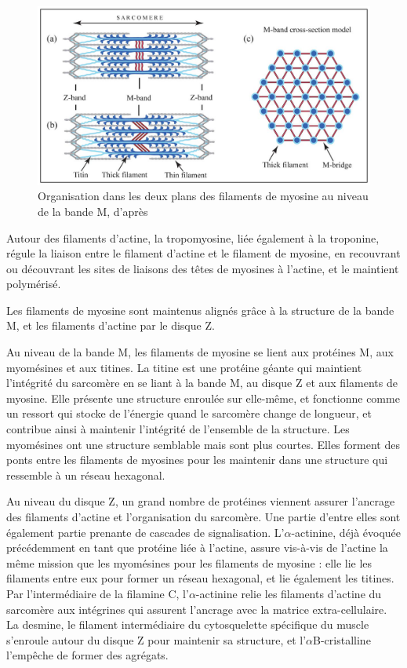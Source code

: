 \begin{figure}
\includegraphics[scale=0.4]{Figures/Myomesine.png}
\caption{Organisation dans les deux plans des filaments de myosine au niveau de la bande M, d'après \cite{tskhovrebova_making_2012}}
\end{figure}
 
Autour des filaments d'actine, la tropomyosine, liée également à la troponine, régule la liaison entre le filament d'actine et le filament de myosine, en recouvrant ou découvrant les sites de liaisons des têtes de myosines à l'actine, et le maintient polymérisé. 

Les filaments de myosine sont maintenus alignés grâce à la structure de la bande M, et les filaments d'actine par le disque Z. 

Au niveau de la bande M, les filaments de myosine se lient aux protéines M, aux myomésines et aux titines. 
La titine est une protéine géante qui maintient l'intégrité du sarcomère en se liant à la bande M, au disque Z et aux filaments de myosine. Elle présente une structure enroulée sur elle-même, et fonctionne comme un ressort qui stocke de l'énergie quand le sarcomère change de longueur, et contribue ainsi à maintenir l'intégrité de l'ensemble de la structure. 
Les myomésines ont une structure semblable mais sont plus courtes. Elles forment des ponts entre les filaments de myosines pour les maintenir dans une structure qui ressemble à un réseau hexagonal. 

Au niveau du disque Z, un grand nombre de protéines viennent assurer l'ancrage des filaments d'actine et l'organisation du sarcomère. Une partie d'entre elles sont également partie prenante de cascades de signalisation.
L'$\alpha$-actinine, déjà évoquée précédemment en tant que protéine liée à l'actine, assure vis-à-vis de l'actine la même mission que les myomésines pour les filaments de myosine : elle lie les filaments entre eux pour former un réseau hexagonal, et lie également les titines. 
Par l'intermédiaire de la filamine C, l'$\alpha$-actinine relie les filaments d'actine du sarcomère aux intégrines qui assurent l'ancrage avec la matrice extra-cellulaire. 
La desmine, le filament intermédiaire du cytosquelette spécifique du muscle s'enroule autour du disque Z pour maintenir sa structure, et l'$\alpha$B-cristalline l'empêche de former des agrégats. 


